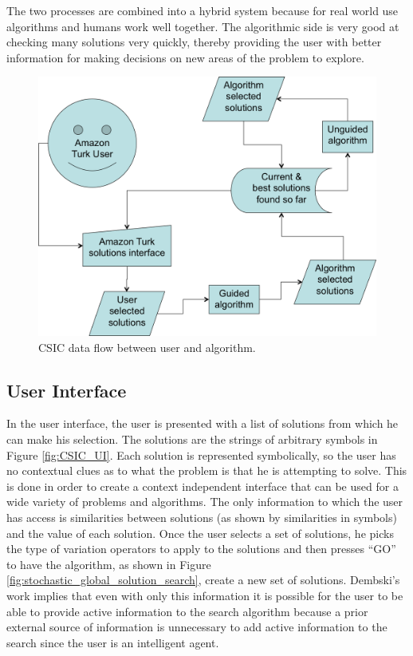 The two processes are combined into a hybrid system because for real world use algorithms and humans work well together.  The algorithmic side is very good at checking many solutions very quickly, thereby providing the user with better information for making decisions on new areas of the problem to explore.

\begin{figure}[!t]
  \centering
  \includegraphics[width=4.5in]{HollowayDataFlow}
  \caption{CSIC data flow between user and algorithm.}
  \label{fig:data_flow}
\end{figure}

\subsection{User Interface}

In the user interface, the user is presented with a list of solutions from which he can make his selection.  The solutions are the strings of arbitrary symbols in Figure \ref{fig:CSIC_UI}.  Each solution is represented symbolically, so the user has no contextual clues as to what the problem is that he is attempting to solve.  This is done in order to create a context independent interface that can be used for a wide variety of problems and algorithms. The only information to which the user has access is similarities between solutions (as shown by similarities in symbols) and the value of each solution. Once the user selects a set of solutions, he picks the type of variation operators to apply to the solutions and then presses ``GO'' to have the algorithm, as shown in Figure \ref{fig:stochastic_global_solution_search}, create a new set of solutions.  Dembski's work implies that even with only this information it is possible for the user to be able to provide active information to the search algorithm because a prior external source of information is unnecessary to add active information to the search since the user is an intelligent agent.

